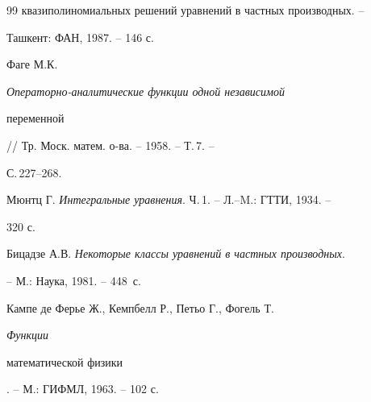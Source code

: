 \begin{thebibliography}{99}
{квазиполиномиальных решений уравнений в частных производных}. -- 


Ташкент: ФАН, 1987. -- 146 с. 


 




Фаге М.К. {\em Операторно-аналитические функции одной независимой 


переменной} // Тр. Моск. матем. о-ва. -- 1958. -- Т.\,7. -- 


С.\,227--268. 


 




Мюнтц Г. {\em Интегральные уравнения}. Ч.\,1. -- Л.--M.: ГТТИ, 1934. -- 


320 с. 


 




Бицадзе А.В. {\em Некоторые классы уравнений в частных производных}. 


-- М.: Наука, 1981. -- 448~с. 


 




Кампе де Ферье Ж., Кемпбелл Р., Петьо Г., Фогель Т. {\em Функции 


математической физики}. -- М.: ГИФМЛ, 1963. -- 102 с. 


 


 


\end{thebibliography} 


 


\vskip 2cm 


 








 


\label{end} 


 



